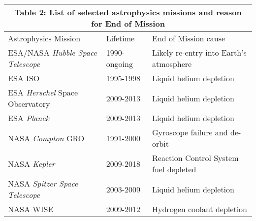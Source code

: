 \documentclass[a4paper,12pt]{texMemo}
\begin{document}
  \begin{table}
\begin{center}
  \begin{tabular}{l l l}
        \multicolumn{3}{c}{Table 2: List of selected astrophysics missions and reason for End of Mission} \\
    \midrule
    Astrophysics Mission   & Lifetime  & End of Mission cause\\
    \midrule
    ESA/NASA \textit{Hubble Space Telescope}   &         1990-ongoing  &  Likely re-entry into Earth's atmosphere\\
    ESA       ISO	                                                   &         1995-1998       &  Liquid helium depletion \\
    ESA    \textit{Herschel} Space Observatory     &         2009-2013	& Liquid helium depletion \\
    ESA     \textit{Planck}	                                   &         2009-2013	& Liquid helium depletion \\ %
    NASA  \textit{Compton} GRO                         &  1991-2000        & Gyroscope failure and de-orbit \\ %
    NASA  \textit{Kepler}                                              & 2009-2018 &  Reaction Control System fuel depleted \\
    NASA  \textit{Spitzer Space Telescope} &2003-2009 & Liquid helium depletion \\
    NASA WISE                                        &2009-2012 & Hydrogen coolant depletion \\
    \bottomrule
      \end{tabular}
\label{tab:space_missions}
  \end{center}
  \end{table}

    \vspace{-38pt}


    
\end{document}
